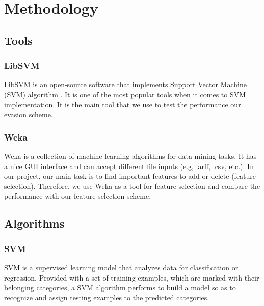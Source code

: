 \documentclass[11pt]{article}
\begin{document}

\section{Methodology}\label{sec:metho}

\subsection{Tools}
\subsubsection{LibSVM}
LibSVM \cite{CC01a} is an open-source software that implements Support Vector Machine (SVM) algorithm \cite{cortes1995support}. It is one of the most popular tools when it comes to SVM implementation. It is the main tool that we use to test the performance our evasion scheme. 

\subsubsection{Weka}
Weka \cite{hall2009weka} is a collection of machine learning algorithms for data mining tasks. It has a nice GUI interface and can accept different file inputs (e.g, .arff, .csv, etc.). In our project, our main task is to find important features to add or delete (feature selection). Therefore, we use Weka as a tool for feature selection and compare the performance with our feature selection scheme.

\subsection{Algorithms}
\subsubsection{SVM}
SVM \cite{cortes1995support} is a supervised learning model that analyzes data for classification or regression. Provided with a set of training examples, which are marked with their belonging categories, a SVM algorithm performs to build a model so as to recognize and assign testing examples to the predicted categories. 
\end{document}
